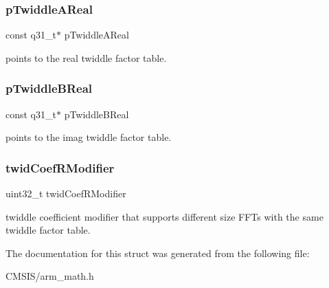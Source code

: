 \subsubsection{\texorpdfstring{pTwiddleAReal}{pTwiddleAReal}}
{\footnotesize\ttfamily const q31\+\_\+t$\ast$ p\+Twiddle\+A\+Real}

points to the real twiddle factor table. \mbox{\label{structarm__rfft__instance__q31_a47ffe031454baeb52b1f5ce1a16e165a}} 
\subsubsection{\texorpdfstring{pTwiddleBReal}{pTwiddleBReal}}
{\footnotesize\ttfamily const q31\+\_\+t$\ast$ p\+Twiddle\+B\+Real}

points to the imag twiddle factor table. \mbox{\label{structarm__rfft__instance__q31_a5b06f7f76c018db993fe6acc5708c589}} 
\subsubsection{\texorpdfstring{twidCoefRModifier}{twidCoefRModifier}}
{\footnotesize\ttfamily uint32\+\_\+t twid\+Coef\+R\+Modifier}

twiddle coefficient modifier that supports different size F\+F\+Ts with the same twiddle factor table. 

The documentation for this struct was generated from the following file\+:\begin{DoxyCompactItemize}
\item 
C\+M\+S\+I\+S/arm\+\_\+math.\+h\end{DoxyCompactItemize}
